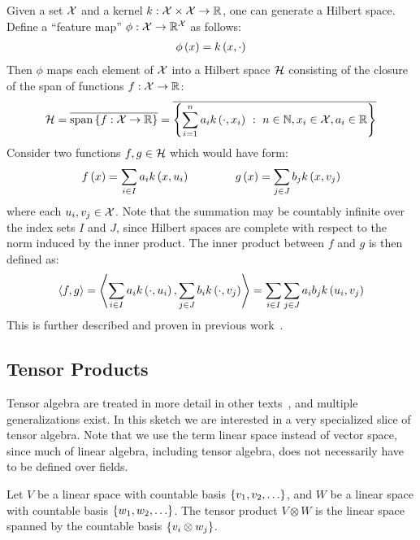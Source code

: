 \documentclass[12pt]{article}
\begin{document}
Given a set \(\mathcal{X}\) and a kernel
\(k : \mathcal{X} \times \mathcal{X} \to \mathbb{R}\),
one can generate a Hilbert space.
Define a ``feature map'' \(\phi : \mathcal{X} \to \mathbb{R}^{\mathcal{X}}\)
as follows:
\begin{align*}
  \phi\left(x\right) = k\left(x, \cdot\right)
\end{align*}
Then \(\phi\) maps each element of \(\mathcal{X}\)
into a Hilbert space \(\mathcal{H}\) consisting of the closure of
the span of functions \(f : \mathcal{X} \to \mathbb{R}\):
\begin{align*}
  \mathcal{H} =
    \overline{\mathrm{span}\left\{f : \mathcal{X} \to \mathbb{R}\right\}}
    = \overline{
        \left\{
          \sum_{i = 1}^{n} a_i k\left(\cdot, x_i\right)
            \  : \  n \in \mathbb{N}, x_i \in \mathcal{X}, a_i \in \mathbb{R}\right\}}
\end{align*}
Consider two functions \(f, g \in \mathcal{H}\) which would have form:
\begin{align*}
  f\left(x\right) = \sum_{i \in I} a_i k\left(x, u_i\right)
  \qquad \qquad
  g\left(x\right) = \sum_{j \in J} b_j k\left(x, v_j\right)
\end{align*}
where each \(u_i, v_j \in \mathcal{X}\).
Note that the summation may be countably infinite over the index sets \(I\)
and \(J\), since Hilbert spaces are complete with
respect to the norm induced by the inner product.
The inner product between \(f\) and \(g\) is then defined as:
\begin{align*}
  \left\langle f, g\right\rangle
    = \left\langle\sum_{i \in I} a_i k\left(\cdot, u_i\right),
              \sum_{j \in J} b_i k\left(\cdot, v_j\right)\right\rangle
    = \sum_{i \in I} \sum_{j \in J} a_i b_j k\left(u_i, v_j\right)
\end{align*}
This is further described and proven in previous
work~\cite{cortes2004rational, vishwanathan2010graph}.



\subsection{Tensor Products}
Tensor algebra are treated in more detail
in other texts~\cite{itskov2007tensor},
and multiple generalizations exist.
In this sketch we are interested in a very specialized slice of
tensor algebra.
Note that we use the term linear space instead of vector space,
since much of linear algebra, including tensor algebra,
does not necessarily have to be defined over fields.

\begin{definition}
  Let \(V\) be a linear space with countable basis
  \(\left\{v_1, v_2, \ldots\right\}\),
  and \(W\) be a linear space with countable basis
  \(\left\{w_1, w_2, \ldots\right\}\).
  The tensor product \(V \otimes W\) is the linear space
  spanned by the countable basis \(\left\{v_i \otimes w_j\right\}\).
\end{definition}
\end{document}
